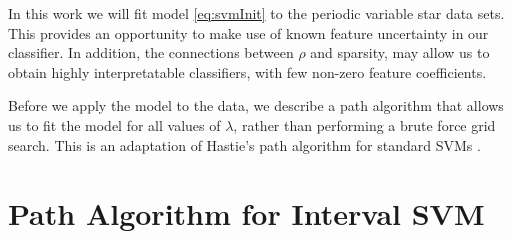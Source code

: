 \documentclass[10pt]{article}
\theoremstyle{definition}
\begin{document}
In this work we will fit model \eqref{eq:svmInit} to the periodic variable star data sets. This provides an opportunity to make use of known feature uncertainty in our classifier. In addition, the connections between $\rho$ and sparsity, may allow us to obtain highly interpretatable classifiers, with few non-zero feature coefficients.

Before we apply the model to the data, we describe a path algorithm that allows us to fit the model for all values of $\lambda$, rather than performing a brute force grid search. This is an adaptation of Hastie's path algorithm for standard SVMs \cite{hastie2004entire}.

\section{Path Algorithm for Interval SVM}
\end{document}
